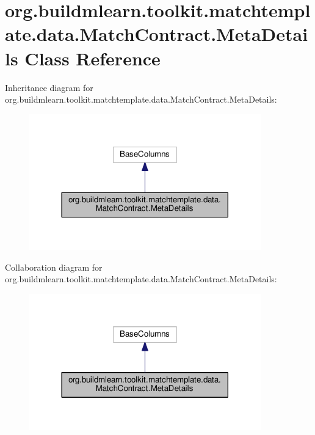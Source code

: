 \hypertarget{classorg_1_1buildmlearn_1_1toolkit_1_1matchtemplate_1_1data_1_1MatchContract_1_1MetaDetails}{}\section{org.\+buildmlearn.\+toolkit.\+matchtemplate.\+data.\+Match\+Contract.\+Meta\+Details Class Reference}
\label{classorg_1_1buildmlearn_1_1toolkit_1_1matchtemplate_1_1data_1_1MatchContract_1_1MetaDetails}


Inheritance diagram for org.\+buildmlearn.\+toolkit.\+matchtemplate.\+data.\+Match\+Contract.\+Meta\+Details\+:
\nopagebreak
\begin{figure}[H]
\begin{center}
\leavevmode
\includegraphics[width=284pt]{classorg_1_1buildmlearn_1_1toolkit_1_1matchtemplate_1_1data_1_1MatchContract_1_1MetaDetails__inherit__graph}
\end{center}
\end{figure}


Collaboration diagram for org.\+buildmlearn.\+toolkit.\+matchtemplate.\+data.\+Match\+Contract.\+Meta\+Details\+:
\nopagebreak
\begin{figure}[H]
\begin{center}
\leavevmode
\includegraphics[width=284pt]{classorg_1_1buildmlearn_1_1toolkit_1_1matchtemplate_1_1data_1_1MatchContract_1_1MetaDetails__coll__graph}
\end{center}
\end{figure}
